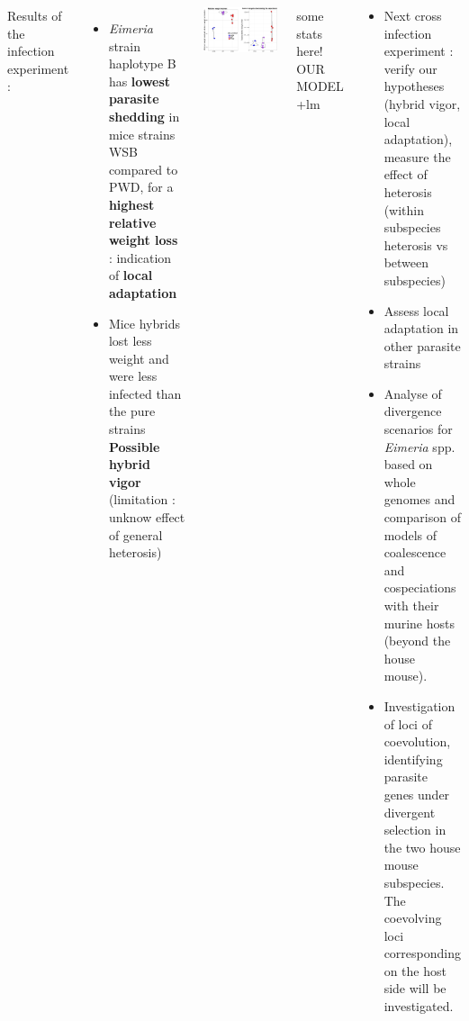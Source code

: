 \documentclass[30pt, a0paper, portrait, margin=0mm, innermargin=15mm,
               blockverticalspace=15mm, colspace=15mm, subcolspace=8mm]{tikzposter}
\begin{document}
\begin{columns}

{ Results of the infection experiment : 
  \begin{itemize}
    \item \textit{Eimeria} strain haplotype B has \textbf{lowest parasite shedding} in mice strains WSB compared to PWD, for a \textbf{highest relative weight loss} : indication of \textbf{local adaptation}
    \item Mice hybrids lost less weight and  were less infected than the pure strains\\ \textbf{Possible hybrid vigor} (limitation : unknow effect of general heterosis)\\
  \end{itemize}

  \begin{center}
  \includegraphics[scale=1.1]{May2017_E64.pdf}

  \end{center}
  
  some stats here!
  OUR MODEL +lm
}

{
  \begin{center}
  \begin{itemize}
        \item Next cross infection experiment : verify our hypotheses (hybrid vigor, local adaptation), measure the effect of heterosis (within subspecies heterosis vs between subspecies)
        \item Assess local adaptation in other parasite strains
        \item Analyse of divergence scenarios for \textit{Eimeria} spp. based on whole genomes and comparison of models of coalescence and cospeciations with their murine hosts (beyond the house mouse).
        \item Investigation of loci of coevolution, identifying parasite genes under divergent selection in the two house mouse subspecies. The coevolving loci corresponding on the host side will be investigated.
  \end{itemize}


\end{center}}
\end{columns}
\end{document}
